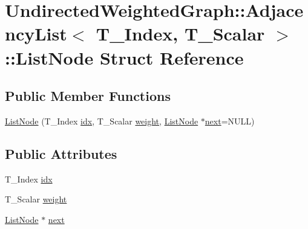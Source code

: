 \hypertarget{struct_undirected_weighted_graph_1_1_adjacency_list_1_1_list_node}{\section{Undirected\+Weighted\+Graph\+:\+:Adjacency\+List$<$ T\+\_\+\+Index, T\+\_\+\+Scalar $>$\+:\+:List\+Node Struct Reference}
\label{struct_undirected_weighted_graph_1_1_adjacency_list_1_1_list_node}
}
\subsection*{Public Member Functions}
\begin{DoxyCompactItemize}
\item 
\hyperlink{struct_undirected_weighted_graph_1_1_adjacency_list_1_1_list_node_a454cc91adb3073dc3f4bdccf1d04f549}{List\+Node} (T\+\_\+\+Index \hyperlink{struct_undirected_weighted_graph_1_1_adjacency_list_1_1_list_node_ae35b343eda23b364db9d9239d9f0ce24}{idx}, T\+\_\+\+Scalar \hyperlink{struct_undirected_weighted_graph_1_1_adjacency_list_1_1_list_node_ad7d0aedb78ca2bf0ae2e9c55a8a32596}{weight}, \hyperlink{struct_undirected_weighted_graph_1_1_adjacency_list_1_1_list_node}{List\+Node} $\ast$\hyperlink{struct_undirected_weighted_graph_1_1_adjacency_list_1_1_list_node_a6f0bbab55afd9ce7a56a14d83816f141}{next}=N\+U\+L\+L)
\end{DoxyCompactItemize}
\subsection*{Public Attributes}
\begin{DoxyCompactItemize}
\item 
T\+\_\+\+Index \hyperlink{struct_undirected_weighted_graph_1_1_adjacency_list_1_1_list_node_ae35b343eda23b364db9d9239d9f0ce24}{idx}
\item 
T\+\_\+\+Scalar \hyperlink{struct_undirected_weighted_graph_1_1_adjacency_list_1_1_list_node_ad7d0aedb78ca2bf0ae2e9c55a8a32596}{weight}
\item 
\hyperlink{struct_undirected_weighted_graph_1_1_adjacency_list_1_1_list_node}{List\+Node} $\ast$ \hyperlink{struct_undirected_weighted_graph_1_1_adjacency_list_1_1_list_node_a6f0bbab55afd9ce7a56a14d83816f141}{next}
\end{DoxyCompactItemize}


